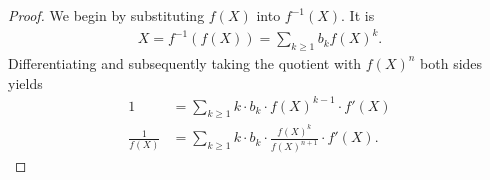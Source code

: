 \documentclass[a4paper]{article}
\theoremstyle{definition}
\begin{document}
\begin{proof}
    We begin by substituting \(f(X)\) into \(f^{-1}(X)\). It is
    \begin{align*}
        X = f^{-1}(f(X)) = \sum_{k \geq 1} b_k f(X)^k \text{.}
    \end{align*}
    Differentiating and subsequently taking the quotient with \(f(X)^n\) both sides yields
    \begin{align*}
        1 &= \sum_{k \geq 1} k \cdot b_k \cdot f(X)^{k - 1} \cdot f'(X) \\
        \frac{1}{f(X)} &= \sum_{k \geq 1} k \cdot b_k \cdot \frac{f(X)^{k}}{f(X)^{n+1}} \cdot f'(X) \text{.}
    \end{align*}
    
\end{proof}
\end{document}
